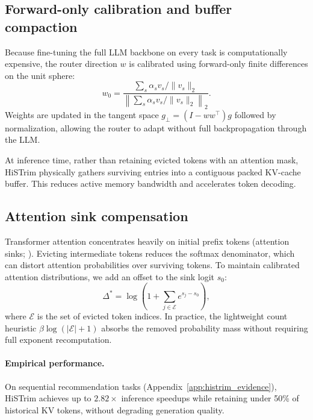 \subsection{Forward-only calibration and buffer compaction}
Because fine-tuning the full LLM backbone on every task is computationally expensive,
the router direction $w$ is calibrated using forward-only finite differences on the unit
sphere:
\begin{equation}
 w_0=\frac{\sum_s\alpha_s v_s/\|v_s\|_2}
 {\left\|\sum_s\alpha_s v_s/\|v_s\|_2\right\|_2}.
\end{equation}
Weights are updated in the tangent space $g_\perp=(I-ww^\top)g$ followed by normalization,
allowing the router to adapt without full backpropagation through the LLM.

At inference time, rather than retaining evicted tokens with an attention mask, HiSTrim
physically gathers surviving entries into a contiguous packed KV-cache buffer. This
reduces active memory bandwidth and accelerates token decoding.

\subsection{Attention sink compensation}
Transformer attention concentrates heavily on initial prefix tokens (attention sinks;
\citealp{xiao2023streamingllm}). Evicting intermediate tokens reduces the softmax
denominator, which can distort attention probabilities over surviving tokens.
To maintain calibrated attention distributions, we add an offset to the sink logit $s_0$:
\begin{equation}
 \Delta^*=\log\left(1+\sum_{j\in\mathcal{E}}e^{s_j-s_0}\right),
\label{eq:exact_sink}
\end{equation}
where $\mathcal{E}$ is the set of evicted token indices. In practice, the lightweight count
heuristic $\beta\log(|\mathcal{E}|+1)$ absorbs the removed probability mass without
requiring full exponent recomputation.

\paragraph{Empirical performance.}
On sequential recommendation tasks (Appendix~\ref{app:histrim_evidence}), HiSTrim achieves
up to $2.82\times$ inference speedups while retaining under 50\% of historical KV tokens,
without degrading generation quality.

